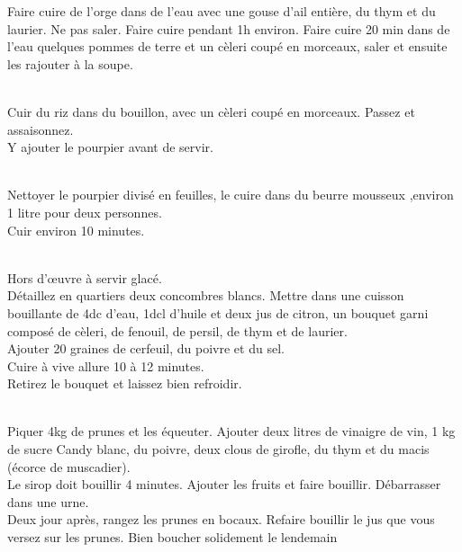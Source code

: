 \begin{minipage}[c]{\textwidth}
Faire cuire de l'orge dans de l'eau avec une gouse d'ail entière, du thym et du laurier. Ne pas saler. Faire cuire pendant 1h environ. Faire cuire 20 min dans de l'eau quelques pommes de terre et un cèleri coupé en morceaux, saler et ensuite les rajouter à la soupe.\\
\\

\end{minipage}

\begin{minipage}[c]{\textwidth}
Cuir du riz dans du bouillon, avec un cèleri coupé en morceaux. Passez et assaisonnez.\\
Y ajouter le pourpier avant de servir.\\
\\

\end{minipage}

\begin{minipage}[c]{\textwidth}
Nettoyer le pourpier divisé en feuilles, le cuire dans du beurre mousseux ,environ 1 litre pour deux personnes.\\
Cuir environ 10 minutes.\\
\\

\end{minipage}

\begin{minipage}[c]{\textwidth}
Hors d'œuvre à servir glacé.\\
Détaillez en quartiers deux concombres blancs. Mettre dans une cuisson bouillante de 4dc d'eau, 1dcl d'huile et deux jus de citron, un bouquet garni composé de cèleri, de fenouil, de persil, de thym et de laurier.\\
Ajouter 20 graines de cerfeuil, du poivre et du sel.\\
Cuire à vive allure 10 à 12 minutes.\\
Retirez le bouquet et laissez bien refroidir.\\
\\

\end{minipage}

\begin{minipage}[c]{\textwidth}
Piquer 4kg de prunes et les équeuter. Ajouter deux litres de vinaigre de vin, 1 kg de sucre Candy blanc, du poivre, deux clous de girofle, du thym et du macis (écorce de muscadier).\\
Le sirop doit bouillir 4 minutes. Ajouter les fruits et faire bouillir. Débarrasser dans une urne.\\
Deux jour après, rangez les prunes en bocaux. Refaire bouillir le jus que vous versez sur les prunes. Bien boucher solidement le lendemain\\
\\

\end{minipage}

